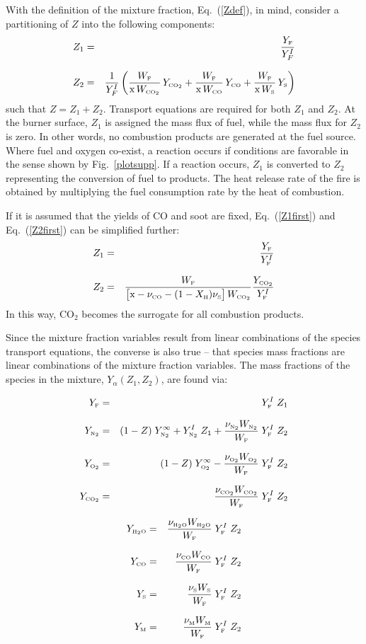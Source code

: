 \documentclass[11pt]{book}
\begin{document}
With the definition of the mixture fraction, Eq.~(\ref{Zdef}), in mind, consider a partitioning of $Z$ into the following components:
\begin{eqnarray}  Z_1 &=& \frac{Y_{\tiny \hbox{F}}}{Y_F^I}  \label{Z1first}  \\*[.1in]
                  Z_2 &=& \frac{1}{Y_F^I} \left( \frac{W_{\tiny \hbox{F}}}{\hbox{x} \, W_{\tiny \hbox{CO}_2} } \,  Y_{\tiny \hbox{CO}_2}  + \frac{W_{\tiny \hbox{F}}}{\hbox{x} \, W_{\tiny \hbox{CO}} } \, Y_{\tiny \hbox{CO}}  +
                  \frac{W_{\tiny \hbox{F}}}{\hbox{x} \, W_{\tiny \hbox{S}} }  \label{Z2first} \, Y_{\tiny \hbox{S}} \right)
\end{eqnarray}
such that $Z=Z_1+Z_2$. Transport equations are required for both $Z_1$ and $Z_2$.
At the burner surface, $Z_1$ is assigned the mass flux of fuel,
while the mass flux for $Z_2$ is zero. In other words, no combustion products are generated at the fuel source. Where fuel and
oxygen co-exist, a reaction occurs if conditions are favorable in the sense shown by Fig.~\ref{plotsupp}.
If a reaction occurs, $Z_1$ is converted to $Z_2$ representing the
conversion of fuel to products. The heat release rate of the fire is obtained by multiplying the fuel consumption rate by the
heat of combustion.

If it is assumed that the yields of CO and soot are fixed, Eq.~(\ref{Z1first}) and Eq.~(\ref{Z2first}) can be simplified further:
\begin{eqnarray} Z_1 &=& \frac{Y_{\tiny \hbox{F}}}{Y_{\tiny \hbox{F}}^I} \\*[.1in]
                 Z_2 &=& \frac{W_{\tiny \hbox{F}}}{\big[\hbox{x}-\nu_{\tiny \hbox{CO}}-(1-X_{\tiny \hbox{H}}) \nu_{\tiny \hbox{S}} \big] \, W_{\tiny \hbox{CO}_2} } \frac{Y_{\tiny \hbox{CO}_2}}{Y_{\tiny \hbox{F}}^I}
\end{eqnarray}
In this way, CO$_2$ becomes the surrogate for all combustion products.

Since the mixture fraction variables result from linear combinations of the species transport equations, the converse
is also true -- that species mass fractions are linear combinations of the mixture fraction variables.
The mass fractions of the species in the mixture, $Y_{\alpha}(Z_1,Z_2)$, are found via:

\parbox{2.5in}{
\begin{eqnarray*}  Y_{\tiny \hbox{F}}     &=& Y_{\tiny \hbox{F}}^I \; Z_1  \\*[.1in]
                  Y_{\tiny \hbox{N}_2}  &=& (1 - Z) \; Y_{\tiny \hbox{N}_2}^\infty  + Y_{\tiny \hbox{N}_2}^I \; Z_1 + \frac{\nu_{\tiny \hbox{N}_2} W_{\tiny \hbox{N}_2}}{W_{\tiny \hbox{F}}} \; Y_{\tiny \hbox{F}}^I \; Z_2  \\*[.1in]
                  Y_{\tiny \hbox{O}_2}  &=& (1 - Z) \; Y_{\tiny \hbox{O}_2}^\infty - \frac{\nu_{\tiny \hbox{O}_2} W_{\tiny \hbox{O}_2}}{W_{\tiny \hbox{F}}} \; Y_{\tiny \hbox{F}}^I \; Z_2 \\*[.1in]
                  Y_{\tiny \hbox{CO}_2} &=& \frac{\nu_{\tiny \hbox{CO}_2} W_{\tiny \hbox{CO}_2}}{W_{\tiny \hbox{F}}} \; Y_{\tiny \hbox{F}}^I \; Z_2 \end{eqnarray*} }
\hfill \parbox{3.5in}{\begin{eqnarray}
                  Y_{\tiny \hbox{H}_2\hbox{O}} &=& \frac{\nu_{\tiny \hbox{H}_2\hbox{O}} W_{\tiny \hbox{H}_2\hbox{O}}}{W_{\tiny \hbox{F}}} \; Y_{\tiny \hbox{F}}^I \; Z_2 \\*[.1in]
                  Y_{\tiny \hbox{CO}}    &=& \frac{\nu_{\tiny \hbox{CO}} W_{\tiny \hbox{CO}}}{W_{\tiny \hbox{F}}} \; Y_{\tiny \hbox{F}}^I \; Z_2  \\*[.1in]
                  Y_{\tiny \hbox{S}}    &=& \frac{\nu_{\tiny \hbox{S}} W_{\tiny \hbox{S}}}{W_{\tiny \hbox{F}}} \; Y_{\tiny \hbox{F}}^I \; Z_2 \\*[.1in]
                  Y_{\tiny \hbox{M}}     &=& \frac{\nu_{\tiny \hbox{M}} W_{\tiny \hbox{M}}}{W_{\tiny \hbox{F}}} \; Y_{\tiny \hbox{F}}^I \; Z_2
\end{eqnarray} }
\end{document}
